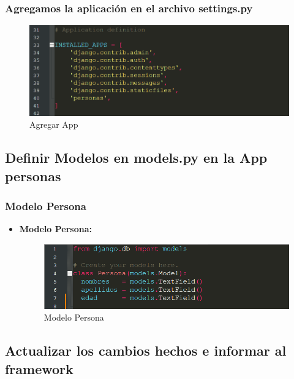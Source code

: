 \documentclass{article}
\begin{document}

  \subsubsection{Agregamos la aplicación en el archivo settings.py}
  \begin{figure}[H]
    \centering
    \includegraphics[width=1\textwidth, keepaspectratio]{img/app.png}
    \caption{Agregar App}
  \end{figure}
  

  \subsection{Definir Modelos en models.py en la App personas}
  

  \subsubsection{Modelo Persona}
  \begin{itemize}
    \item \textbf{Modelo Persona:}
    \begin{figure}[H]
      \centering
      \includegraphics[width=1\textwidth, keepaspectratio]{img/modelo.png}
      \caption{Modelo Persona}
    \end{figure}  
  \end{itemize}
  

  \subsection{Actualizar los cambios hechos e informar al framework}
  
\end{document}
